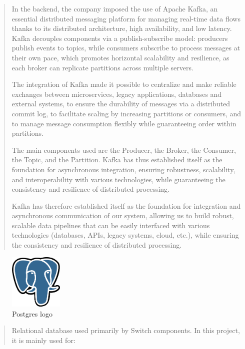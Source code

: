\documentclass[12pt,a4paper]{report}
\begin{document}
\begin{quote}
In the backend, the company imposed the use of Apache Kafka, an
essential distributed messaging platform for managing real-time data
flows thanks to its distributed architecture, high availability, and low
latency. Kafka decouples components via a publish-subscribe model:
producers publish events to topics, while consumers subscribe to process
messages at their own pace, which promotes horizontal scalability and
resilience, as each broker can replicate partitions across multiple
servers.

The integration of Kafka made it possible to centralize and make
reliable exchanges between microservices, legacy applications, databases
and external systems, to ensure the durability of messages via a
distributed commit log, to facilitate scaling by increasing partitions
or consumers, and to manage message consumption flexibly while
guaranteeing order within partitions.

The main components used are the Producer, the Broker, the Consumer, the
Topic, and the Partition. Kafka has thus established itself as the
foundation for asynchronous integration, ensuring robustness,
scalability, and interoperability with various technologies, while
guaranteeing the consistency and resilience of distributed processing.

Kafka has therefore established itself as the foundation for integration
and asynchronous communication of our system, allowing us to build
robust, scalable data pipelines that can be easily interfaced with
various technologies (databases, APIs, legacy systems, cloud, etc.),
while ensuring the consistency and resilience of distributed processing.
\end{quote}

\begin{figure}[H]
\centering
\includegraphics[width=1in]{media/image86.png}
\caption{Postgres logo}
\label{fig:SIL}
\end{figure} 

\begin{quote}
Relational database used primarily by Switch components. In this
project, it is mainly used for:
\end{quote}
\end{document}
